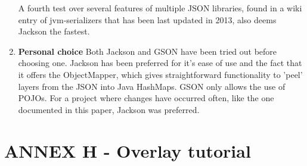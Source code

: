 \documentclass{article}
\begin{document}
\begin{enumerate}
  A fourth test over several features of multiple JSON libraries, found in a
  wiki entry of jvm-serializers that has been last updated in 2013, also deems
  Jackson the fastest.
  
  \item \textbf{Personal choice} Both Jackson and GSON have been tried out
  before choosing one. Jackson has been preferred for it's ease of use and the fact
  that it offers the ObjectMapper, which gives straightforward functionality to
  'peel' layers from the JSON into Java HashMaps. GSON only allows the use of
  POJOs. For a project where changes have occurred often, like the one
  documented in this paper, Jackson was preferred.
  
  
\end{enumerate}


\section{ANNEX H - Overlay tutorial}
\end{document}
